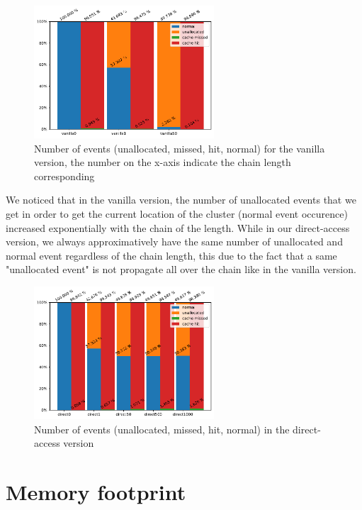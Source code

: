 \documentclass[sigplan,screen,10pt]{acmart}
\begin{document}
	
	\begin{figure}[h]
		\center
		\includegraphics[width=0.6\textwidth]{number_events_per_chain_va.pdf}
		\caption{Number of events (unallocated, missed, hit, normal) for the vanilla version, the number on the x-axis indicate the chain length corresponding}
		\label{fig:fig36}
	\end{figure}

	We noticed that in the vanilla version, the number of unallocated events that we get in order to get the current location of the cluster (normal event occurence) increased exponentially with the chain of the length. While in our direct-access version, we always approximatively have the same number of unallocated and normal event regardless of the chain length, this due to the fact that a same "unallocated event" is not propagate all over the chain like in the vanilla version.
	
	\begin{figure}[h]
		\center
		\includegraphics[width=0.6\textwidth]{number_events_per_chain_di.pdf}
		\caption{Number of events (unallocated, missed, hit, normal) in the direct-access version}
		\label{fig:fig36}
	\end{figure}


	\section*{Memory footprint}
	
\end{document}

